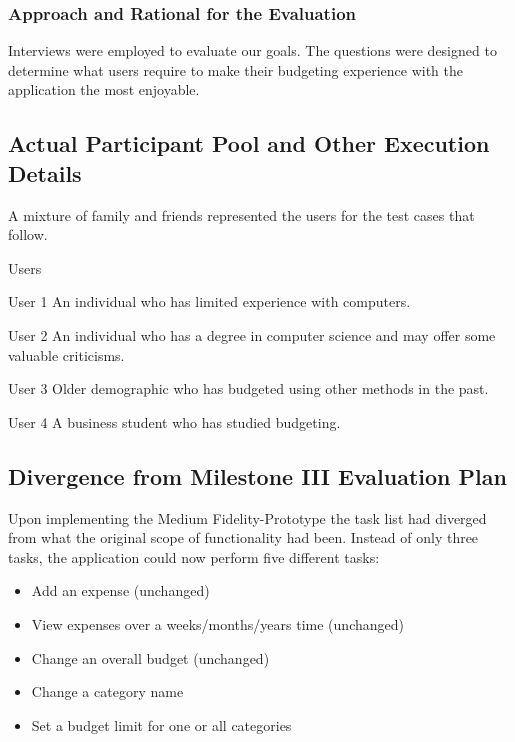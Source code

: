 \documentclass{chi2011}
\begin{document}
		\subsubsection{Approach and Rational for the Evaluation}

        Interviews were employed to evaluate our goals. The questions were designed
        to determine what users require to make their budgeting experience with the
        application the most enjoyable.


	\subsection{Actual Participant Pool and Other Execution Details}

	A mixture of family and friends represented the users for the test cases that follow.

	\begin{labeling}{Users}
		\item [User 1] An individual who has limited experience with computers.  
		\item [User 2] An individual who has a degree in computer science and may offer some valuable criticisms. 
		\item [User 3] Older demographic who has budgeted using other methods in the past.
		\item [User 4] A business student who has studied budgeting.
	\end{labeling}


	\subsection{Divergence from Milestone III Evaluation Plan}

 Upon implementing the Medium Fidelity-Prototype the task list had diverged
 from what the original scope of functionality had been. Instead of only three
 tasks, the application could now perform five different tasks:
	
	\begin{itemize}[noitemsep]
		\item Add an expense (unchanged)
		\item View expenses over a weeks/months/years time (unchanged)
		\item Change an overall budget (unchanged)
		\item Change a category name
		\item Set a budget limit for one or all categories
	\end{itemize}
\end{document}
